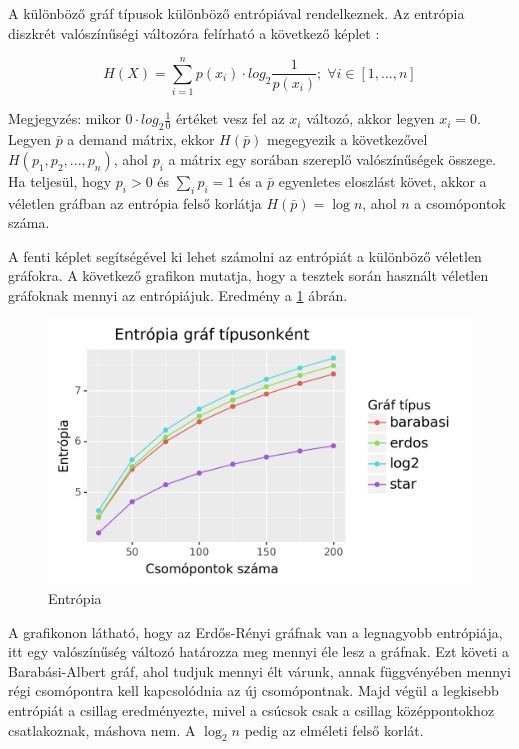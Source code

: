 \documentclass[12pt]{report}
\begin{document}
A különböző gráf típusok különböző entrópiával rendelkeznek.
Az entrópia diszkrét valószínűségi változóra felírható a következő képlet \cite{DBLP:journals/corr/AvinMS17}:  

\[H(X) = \sum_{i=1}^{n} p(x_i) \cdot log_2\frac{1}{p(x_i)}; \; \forall i\in[1, ..., n] \] 

Megjegyzés: mikor \(0\cdot log_2\frac{1}{0}\) értéket vesz fel az \(x_i\) változó, akkor legyen \(x_i=0\). 
Legyen \(\bar{p}\) a demand mátrix, ekkor \(H(\bar{p})\) megegyezik a következővel \(H(p_1, p_2, ..., p_n)\), ahol \(p_i\) a mátrix egy sorában szereplő valószínűségek összege.
Ha teljesül, hogy \(p_i > 0\) és $\sum_{i}p_i = 1$ és a \(\bar{p}\) egyenletes eloszlást követ, akkor a véletlen gráfban az entrópia felső korlátja \(H(\bar{p}) = \log n\), ahol $n$ a csomópontok száma.

A fenti képlet segítségével ki lehet számolni az entrópiát a különböző véletlen gráfokra.
A következő grafikon mutatja, hogy a tesztek során használt véletlen gráfoknak mennyi az entrópiájuk.
Eredmény a \ref{entropy} ábrán.

\begin{figure}[H]
	\begin{center}
		\includegraphics[width=0.9\linewidth]{pictures/entropy.png}
		\caption{Entrópia}
		\label{entropy}
	\end{center}
\end{figure}

A grafikonon látható, hogy az Erdős-Rényi gráfnak van a legnagyobb entrópiája, itt egy valószínűség változó határozza meg mennyi éle lesz a gráfnak.
Ezt követi a Barabási-Albert gráf, ahol tudjuk mennyi élt várunk, annak függvényében mennyi régi csomópontra kell kapcsolódnia az új csomópontnak.
Majd végül a legkisebb entrópiát a csillag eredményezte, mivel a csúcsok csak a csillag középpontokhoz csatlakoznak, máshova nem.
A $\log_2n$ pedig az elméleti felső korlát.
\end{document}

